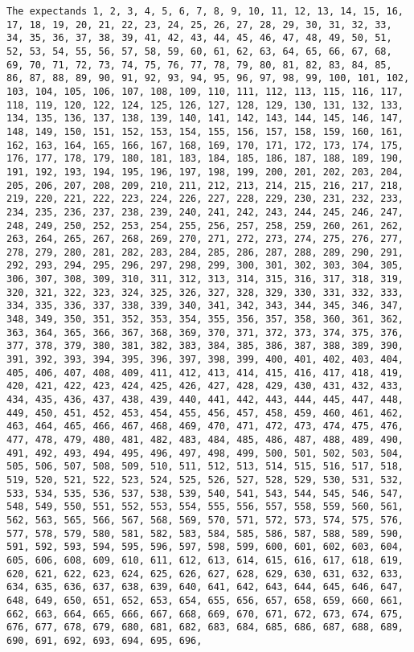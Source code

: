 \documentclass[
  letterpaper,
  DIV=11,
  numbers=noendperiod]{scrartcl}
\begin{document}
\begin{verbatim}
The expectands 1, 2, 3, 4, 5, 6, 7, 8, 9, 10, 11, 12, 13, 14, 15, 16, 17, 18, 19, 20, 21, 22, 23, 24, 25, 26, 27, 28, 29, 30, 31, 32, 33, 34, 35, 36, 37, 38, 39, 41, 42, 43, 44, 45, 46, 47, 48, 49, 50, 51, 52, 53, 54, 55, 56, 57, 58, 59, 60, 61, 62, 63, 64, 65, 66, 67, 68, 69, 70, 71, 72, 73, 74, 75, 76, 77, 78, 79, 80, 81, 82, 83, 84, 85, 86, 87, 88, 89, 90, 91, 92, 93, 94, 95, 96, 97, 98, 99, 100, 101, 102, 103, 104, 105, 106, 107, 108, 109, 110, 111, 112, 113, 115, 116, 117, 118, 119, 120, 122, 124, 125, 126, 127, 128, 129, 130, 131, 132, 133, 134, 135, 136, 137, 138, 139, 140, 141, 142, 143, 144, 145, 146, 147, 148, 149, 150, 151, 152, 153, 154, 155, 156, 157, 158, 159, 160, 161, 162, 163, 164, 165, 166, 167, 168, 169, 170, 171, 172, 173, 174, 175, 176, 177, 178, 179, 180, 181, 183, 184, 185, 186, 187, 188, 189, 190, 191, 192, 193, 194, 195, 196, 197, 198, 199, 200, 201, 202, 203, 204, 205, 206, 207, 208, 209, 210, 211, 212, 213, 214, 215, 216, 217, 218, 219, 220, 221, 222, 223, 224, 226, 227, 228, 229, 230, 231, 232, 233, 234, 235, 236, 237, 238, 239, 240, 241, 242, 243, 244, 245, 246, 247, 248, 249, 250, 252, 253, 254, 255, 256, 257, 258, 259, 260, 261, 262, 263, 264, 265, 267, 268, 269, 270, 271, 272, 273, 274, 275, 276, 277, 278, 279, 280, 281, 282, 283, 284, 285, 286, 287, 288, 289, 290, 291, 292, 293, 294, 295, 296, 297, 298, 299, 300, 301, 302, 303, 304, 305, 306, 307, 308, 309, 310, 311, 312, 313, 314, 315, 316, 317, 318, 319, 320, 321, 322, 323, 324, 325, 326, 327, 328, 329, 330, 331, 332, 333, 334, 335, 336, 337, 338, 339, 340, 341, 342, 343, 344, 345, 346, 347, 348, 349, 350, 351, 352, 353, 354, 355, 356, 357, 358, 360, 361, 362, 363, 364, 365, 366, 367, 368, 369, 370, 371, 372, 373, 374, 375, 376, 377, 378, 379, 380, 381, 382, 383, 384, 385, 386, 387, 388, 389, 390, 391, 392, 393, 394, 395, 396, 397, 398, 399, 400, 401, 402, 403, 404, 405, 406, 407, 408, 409, 411, 412, 413, 414, 415, 416, 417, 418, 419, 420, 421, 422, 423, 424, 425, 426, 427, 428, 429, 430, 431, 432, 433, 434, 435, 436, 437, 438, 439, 440, 441, 442, 443, 444, 445, 447, 448, 449, 450, 451, 452, 453, 454, 455, 456, 457, 458, 459, 460, 461, 462, 463, 464, 465, 466, 467, 468, 469, 470, 471, 472, 473, 474, 475, 476, 477, 478, 479, 480, 481, 482, 483, 484, 485, 486, 487, 488, 489, 490, 491, 492, 493, 494, 495, 496, 497, 498, 499, 500, 501, 502, 503, 504, 505, 506, 507, 508, 509, 510, 511, 512, 513, 514, 515, 516, 517, 518, 519, 520, 521, 522, 523, 524, 525, 526, 527, 528, 529, 530, 531, 532, 533, 534, 535, 536, 537, 538, 539, 540, 541, 543, 544, 545, 546, 547, 548, 549, 550, 551, 552, 553, 554, 555, 556, 557, 558, 559, 560, 561, 562, 563, 565, 566, 567, 568, 569, 570, 571, 572, 573, 574, 575, 576, 577, 578, 579, 580, 581, 582, 583, 584, 585, 586, 587, 588, 589, 590, 591, 592, 593, 594, 595, 596, 597, 598, 599, 600, 601, 602, 603, 604, 605, 606, 608, 609, 610, 611, 612, 613, 614, 615, 616, 617, 618, 619, 620, 621, 622, 623, 624, 625, 626, 627, 628, 629, 630, 631, 632, 633, 634, 635, 636, 637, 638, 639, 640, 641, 642, 643, 644, 645, 646, 647, 648, 649, 650, 651, 652, 653, 654, 655, 656, 657, 658, 659, 660, 661, 662, 663, 664, 665, 666, 667, 668, 669, 670, 671, 672, 673, 674, 675, 676, 677, 678, 679, 680, 681, 682, 683, 684, 685, 686, 687, 688, 689, 690, 691, 692, 693, 694, 695, 696, 
\end{verbatim}
\end{document}
